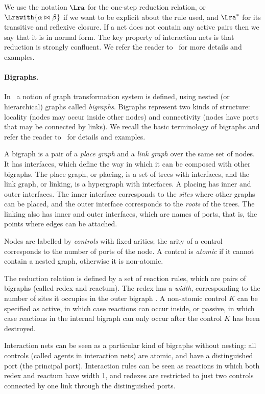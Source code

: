 \documentclass[copyright,creativecommons]{eptcs}
\begin{document}
We use the notation $\Lra$ for the one-step reduction relation, or
$\Lrawith{\alpha \bowtie \beta}$ if we want to be explicit about the
rule used, and $\Lra^*$ for its transitive and reflexive closure. If a
net does not contain any active pairs then we say that it is in normal
form. The key property of interaction nets is that reduction is
strongly confluent.  We refer the reader to~\cite{LafontY:intn} for
more details and examples.

\paragraph{Bigraphs.}
In~\cite{Milner,jensen03bigraphs} a notion of graph transformation
system is defined, using nested (or hierarchical) graphs called
\emph{bigraphs}.  Bigraphs represent two kinds of structure: locality
(nodes may occur inside other nodes) and connectivity (nodes have
ports that may be connected by links). We recall the basic terminology
of bigraphs and refer the reader to~\cite{Milner} for details and
examples.

A bigraph is a pair of a \emph{place graph} and a \emph{link graph}
over the same set of nodes. 
It has interfaces, which define the way in which it can be composed
with other bigraphs. The place graph, or placing, is a set of trees
with interfaces, and the link graph, or linking, is a hypergraph with
interfaces. A placing has inner and outer interfaces. The inner
interface corresponds to the \emph{sites} where other graphs can be
placed, and the outer interface corresponds to the \emph{roots} of the
trees. The linking also has inner and outer interfaces, which are
names of ports, that is, the points where edges can be attached.

Nodes are labelled by \emph{controls} with fixed arities; the arity of
a control corresponds to the number of ports of the node.  A control
is \emph{atomic} if it cannot contain a nested graph, otherwise it is
non-atomic.


The reduction relation is defined by a set of reaction rules, which
are pairs of bigraphs (called redex and reactum). The redex has a
\emph{width}, corresponding to the number of sites it occupies in the
outer bigraph \cite{jensen03bigraphs}.  A non-atomic control $K$ can
be specified as active, in which case reactions can occur inside, or
passive, in which case reactions in the internal bigraph can only
occur after the control $K$ has been destroyed.

Interaction nets can be seen as a particular kind of bigraphs without
nesting: all controls (called agents in interaction nets) are atomic,
and have a distinguished port (the principal port). Interaction rules
can be seen as reactions in which both redex and reactum have width 1,
and redexes are restricted to just two controls connected by one link
through the distinguished ports.
\end{document}
